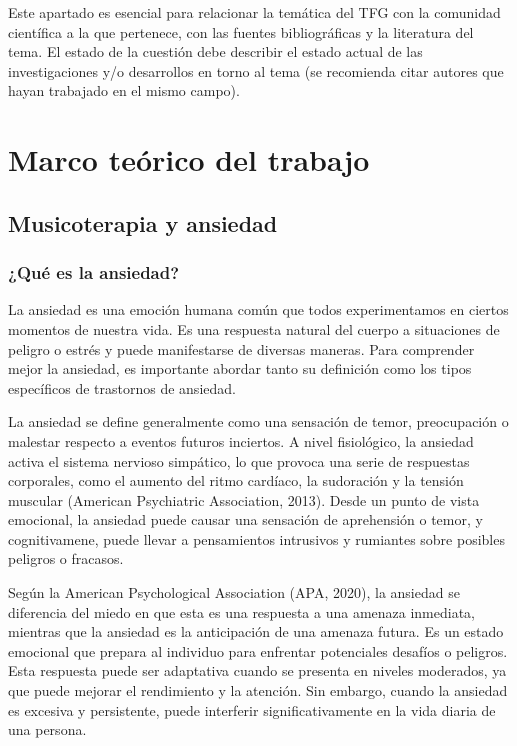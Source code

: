 Este apartado es esencial para relacionar la temática del TFG con la comunidad científica a la que pertenece, con las fuentes bibliográficas y la literatura del tema. El estado de la cuestión debe describir el estado actual de las investigaciones y/o desarrollos en torno al tema (se recomienda citar autores que hayan trabajado en el mismo campo).

\section{Marco teórico del trabajo}

\subsection{Musicoterapia y ansiedad}

\subsubsection{¿Qué es la ansiedad?}

La ansiedad es una emoción humana común que todos experimentamos en ciertos momentos de nuestra vida. Es una respuesta natural del cuerpo a situaciones de peligro o estrés y puede manifestarse de diversas maneras. Para comprender mejor la ansiedad, es importante abordar tanto su definición como los tipos específicos de trastornos de ansiedad.

La ansiedad se define generalmente como una sensación de temor, preocupación o malestar respecto a eventos futuros inciertos. A nivel fisiológico, la ansiedad activa el sistema nervioso simpático, lo que provoca una serie de respuestas corporales, como el aumento del ritmo cardíaco, la sudoración y la tensión muscular (American Psychiatric Association, 2013). Desde un punto de vista emocional, la ansiedad puede causar una sensación de aprehensión o temor, y cognitivamene, puede llevar a pensamientos intrusivos y rumiantes sobre posibles peligros o fracasos.

Según la American Psychological Association (APA, 2020), la ansiedad se diferencia del miedo en que esta es una respuesta a una amenaza inmediata, mientras que la ansiedad es la anticipación de una amenaza futura. Es un estado emocional que prepara al individuo para enfrentar potenciales desafíos o peligros. Esta respuesta puede ser adaptativa cuando se presenta en niveles moderados, ya que puede mejorar el rendimiento y la atención. Sin embargo, cuando la ansiedad es excesiva y persistente, puede interferir significativamente en la vida diaria de una persona.

